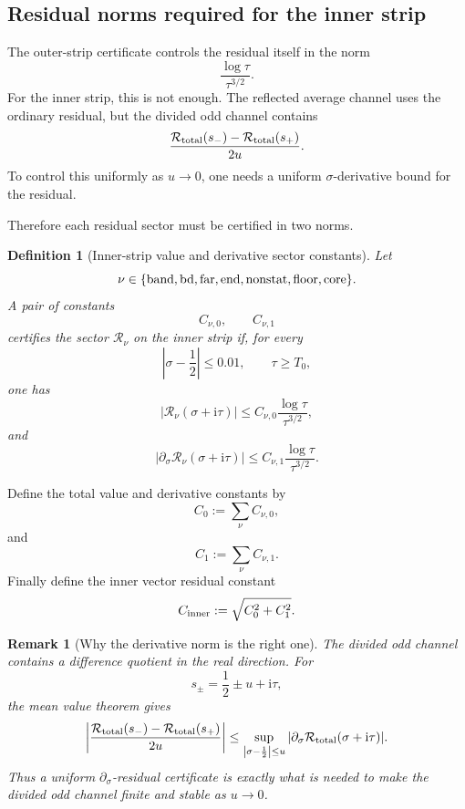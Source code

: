 \documentclass[11pt]{article}
\newtheorem{definition}[theorem]{Definition}
\newtheorem{remark}[theorem]{Remark}
\newcommand{\ii}{\mathrm{i}}
\newcommand{\Rtot}{\mathcal R_{\rm total}}
\newcommand{\Cinner}{C_{\rm inner}}
\newcommand{\Czero}{C_0}
\newcommand{\Cone}{C_1}
\begin{document}
\subsection{Residual norms required for the inner strip}

The outer-strip certificate controls the residual itself in the norm
\[
        \frac{\log\tau}{\tau^{3/2}}.
\]
For the inner strip, this is not enough.  The reflected average channel uses
the ordinary residual, but the divided odd channel contains
\[
        \frac{\Rtot(s_-)-\Rtot(s_+)}{2u}.
\]
To control this uniformly as \(u\to0\), one needs a uniform
\(\sigma\)-derivative bound for the residual.

Therefore each residual sector must be certified in two norms.

\begin{definition}[Inner-strip value and derivative sector constants]
\label{def:inner-sector-constants}
Let
\[
        \nu\in
        \{
        {\rm band},
        {\rm bd},
        {\rm far},
        {\rm end},
        {\rm nonstat},
        {\rm floor},
        {\rm core}
        \}.
\]
A pair of constants
\[
        C_{\nu,0},
        \qquad
        C_{\nu,1}
\]
certifies the sector \(\mathcal R_\nu\) on the inner strip if, for every
\[
        \left|\sigma-\frac12\right|\le0.01,
        \qquad
        \tau\ge T_0,
\]
one has
\[
        |\mathcal R_\nu(\sigma+\ii\tau)|
        \le
        C_{\nu,0}
        \frac{\log\tau}{\tau^{3/2}},
\]
and
\[
        |\partial_\sigma\mathcal R_\nu(\sigma+\ii\tau)|
        \le
        C_{\nu,1}
        \frac{\log\tau}{\tau^{3/2}}.
\]
\end{definition}

Define the total value and derivative constants by
\[
        \Czero
        :=
        \sum_\nu C_{\nu,0},
\]
and
\[
        \Cone
        :=
        \sum_\nu C_{\nu,1}.
\]
Finally define the inner vector residual constant
\[
        \Cinner
        :=
        \sqrt{\Czero^2+\Cone^2}.
\]

\begin{remark}[Why the derivative norm is the right one]
The divided odd channel contains a difference quotient in the real direction.
For
\[
        s_\pm=\frac12\pm u+\ii\tau,
\]
the mean value theorem gives
\[
        \left|
        \frac{\Rtot(s_-)-\Rtot(s_+)}{2u}
        \right|
        \le
        \sup_{\left|\sigma-\frac12\right|\le u}
        |\partial_\sigma\Rtot(\sigma+\ii\tau)|.
\]
Thus a uniform \(\partial_\sigma\)-residual certificate is exactly what is
needed to make the divided odd channel finite and stable as \(u\to0\).
\end{remark}
\end{document}
